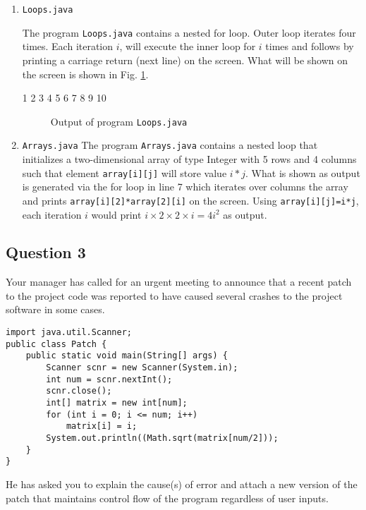 \documentclass[12pt,letterpaper,twoside]{article}
\begin{document}
\begin{enumerate}[label=(\alph*)]
\item \texttt{Loops.java}

The program \texttt{Loops.java} contains a nested for loop. Outer loop iterates four times. Each iteration $i$, will execute the inner loop for $i$ times and follows by printing a carriage return (next line) on the screen. What will be shown on the screen is shown in Fig. \ref{fig1}.

\begin{verbbox}
1
2 3
4 5 6
7 8 9 10
\end{verbbox}
\begin{figure}[H]\centering
\theverbbox
\caption{Output of program \texttt{Loops.java}} \label{fig1}
\end{figure}

\item \texttt{Arrays.java}
The program \texttt{Arrays.java} contains a nested loop that initializes a two-dimensional array of type Integer with 5 rows and 4 columns such that element \texttt{array[i][j]} will store value $i*j$. What is shown as output is generated via the for loop in line 7 which iterates over columns the array and prints \texttt{array[i][2]*array[2][i]} on the screen. Using \texttt{array[i][j]=i*j}, each iteration $i$ would print $i\times 2\times 2\times i = 4 i^2$ as output.

\end{enumerate}

\newpage

\subsection*{Question 3}

Your manager has called for an urgent meeting to announce that a recent patch to the project code was reported to have caused several crashes to the project software in some cases.

\lstset{language=java, tabsize=2}
\begin{lstlisting}
import java.util.Scanner;
public class Patch {
	public static void main(String[] args) {
		Scanner scnr = new Scanner(System.in);
		int num = scnr.nextInt();
		scnr.close();
		int[] matrix = new int[num];
		for (int i = 0; i <= num; i++)
			matrix[i] = i;
		System.out.println((Math.sqrt(matrix[num/2]));
	}
}
\end{lstlisting}

He has asked you to explain the cause(s) of error and attach a new version of the patch that maintains control flow of the program regardless of user inputs.
\end{document}
